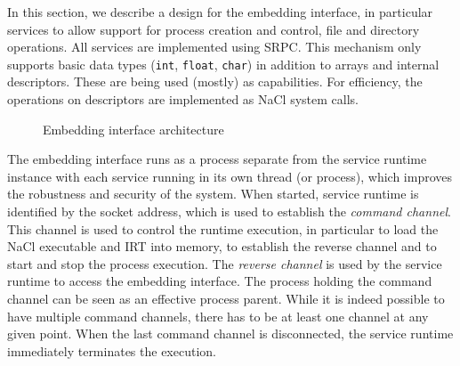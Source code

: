 
In this section, we describe a design for the embedding interface, in
particular services to allow support for process creation and control,
file and directory operations.  All services are implemented using SRPC.
This mechanism only supports basic data types (\ie \lstinline`int`,
\lstinline`float`, \lstinline`char`) in addition to arrays and internal
descriptors. These are being used (mostly) as capabilities. For
efficiency, the operations on descriptors are implemented as NaCl system
calls.




\begin{figure}
\centering
\caption{Embedding interface architecture}
\label{fig:architecture}
\end{figure}

The embedding interface runs as a process separate from the service
runtime instance with each service running in its own thread (or
process), which improves the robustness and security of the system. When
started, service runtime is identified by the socket address, which is
used to establish the \emph{command channel}. This channel is used to
control the runtime execution, in particular to load the NaCl executable
and IRT into memory, to establish the reverse channel and to start and
stop the process execution.  The \emph{reverse channel} is used by the
service runtime to access the embedding interface. The process holding
the command channel can be seen as an effective process parent. While it
is indeed possible to have multiple command channels, there has to be at
least one channel at any given point.  When the last command channel is
disconnected, the service runtime immediately terminates the execution.

